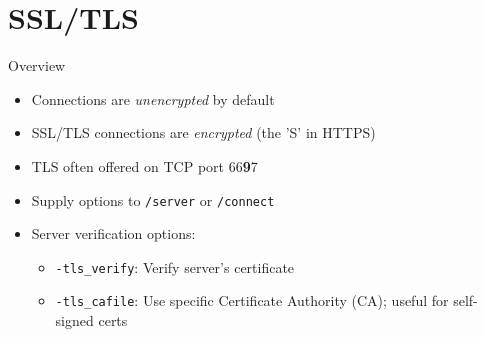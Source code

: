 \documentclass{beamer}
\begin{document}
\section{SSL/TLS}

\begin{frame}{Overview}
\begin{itemize}
	\item Connections are \emph{unencrypted} by default
	\item SSL/TLS connections are \emph{encrypted} (the 'S' in HTTPS)
	\item TLS often offered on TCP port 66\textbf{9}7
	\item Supply options to \texttt{/server} or \texttt{/connect}
	\item Server verification options:
	\begin{itemize}
		\item \texttt{-tls\_verify}: Verify server's certificate
		\item \texttt{-tls\_cafile}: Use specific Certificate Authority (CA); useful for self-signed certs
	\end{itemize}

\end{itemize}
\end{frame}
\end{document}
